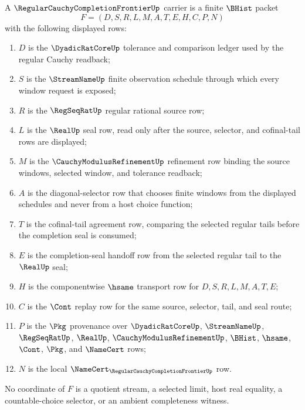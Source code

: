 \begin{definition}
\label{def:regular-cauchy-completion-frontier-carrier}
A $\RegularCauchyCompletionFrontierUp$ carrier is a finite $\BHist$ packet
$$
F=(D,S,R,L,M,A,T,E,H,C,P,N)
$$
with the following displayed rows:
\begin{enumerate}
\item $D$ is the $\DyadicRatCoreUp$ tolerance and comparison ledger used by the regular Cauchy readback;
\item $S$ is the $\StreamNameUp$ finite observation schedule through which every window request is exposed;
\item $R$ is the $\RegSeqRatUp$ regular rational source row;
\item $L$ is the $\RealUp$ seal row, read only after the source, selector, and cofinal-tail rows are displayed;
\item $M$ is the $\CauchyModulusRefinementUp$ refinement row binding the source windows, selected window, and tolerance readback;
\item $A$ is the diagonal-selector row that chooses finite windows from the displayed schedules and never from a host choice function;
\item $T$ is the cofinal-tail agreement row, comparing the selected regular tails before the completion seal is consumed;
\item $E$ is the completion-seal handoff row from the selected regular tail to the $\RealUp$ seal;
\item $H$ is the componentwise $\hsame$ transport row for $D,S,R,L,M,A,T,E$;
\item $C$ is the $\Cont$ replay row for the same source, selector, tail, and seal route;
\item $P$ is the $\Pkg$ provenance over $\DyadicRatCoreUp$, $\StreamNameUp$, $\RegSeqRatUp$, $\RealUp$, $\CauchyModulusRefinementUp$, $\BHist$, $\hsame$, $\Cont$, $\Pkg$, and $\NameCert$ rows;
\item $N$ is the local $\NameCert_{\RegularCauchyCompletionFrontierUp}$ row.
\end{enumerate}
No coordinate of $F$ is a quotient stream, a selected limit, host real equality, a countable-choice selector, or an ambient completeness witness.
\end{definition}

